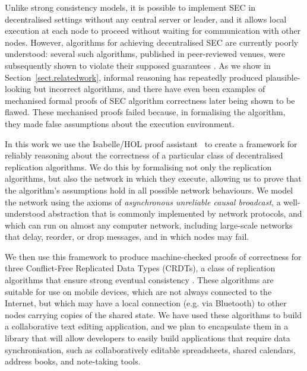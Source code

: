 \documentclass[acmlarge,review,anonymous]{acmart}
\begin{document}
Unlike strong consistency models, it is possible to implement SEC in decentralised settings without any central server or leader, and it allows local execution at each node to proceed without waiting for communication with other nodes.
However, algorithms for achieving decentralised SEC are currently poorly understood: several such algorithms, published in peer-reviewed venues, were subsequently shown to violate their supposed guarantees \cite{Imine:2003ks,Imine:2006kn,Oster:2005vi}.
As we show in Section~\ref{sect.relatedwork}, informal reasoning has repeatedly produced plausible-looking but incorrect algorithms, and there have even been examples of mechanised formal proofs of SEC algorithm correctness later being shown to be flawed.
These mechanised proofs failed because, in formalising the algorithm, they made false assumptions about the execution environment.

In this work we use the Isabelle/HOL proof assistant~\cite{DBLP:conf/tphol/WenzelPN08} to create a framework for reliably reasoning about the correctness of a particular class of decentralised replication algorithms.
We do this by formalising not only the replication algorithms, but also the network in which they execute, allowing us to prove that the algorithm's assumptions hold in all possible network behaviours.
We model the network using the axioms of \emph{asynchronous unreliable causal broadcast}, a well-understood abstraction that is commonly implemented by network protocols, and which can run on almost any computer network, including large-scale networks that delay, reorder, or drop messages, and in which nodes may fail.

We then use this framework to produce machine-checked proofs of correctness for three Conflict-Free Replicated Data Types (CRDTs), a class of replication algorithms that ensure strong eventual consistency \cite{Shapiro:2011wy,Shapiro:2011un}.
These algorithms are suitable for use on mobile devices, which are not always connected to the Internet, but which may have a local connection (e.g. via Bluetooth) to other nodes carrying copies of the shared state.
We have used these algorithms to build a collaborative text editing application, and we plan to encapsulate them in a library that will allow developers to easily build applications that require data synchronisation, such as collaboratively editable spreadsheets, shared calendars, address books, and note-taking tools.
\end{document}
